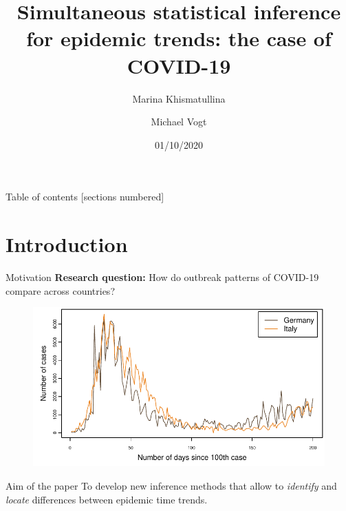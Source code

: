 \documentclass[10pt]{beamer}
\title{Simultaneous statistical inference for epidemic trends: the case of COVID-19}
\date{01/10/2020}
\author{Marina Khismatullina \and Michael Vogt}
\begin{document}
\maketitle

\begin{frame}{Table of contents}
  [sections numbered]
  \tableofcontents[hideallsubsections]
\end{frame}

\section{Introduction}


\begin{frame}{Motivation}
	\textbf{Research question:}	
	How do outbreak patterns of COVID-19 compare across countries?
	\begin{figure}
    		\centering
    		\includegraphics[height=0.45\textheight]{plots/Germany_and_Italy.pdf}
    		\label{fig:DEUvsITA}
  	\end{figure}\pause
	\vspace{-3mm}
	\begin{block}{Aim of the paper}
	To develop new inference methods that allow to \textit{identify} and \textit{locate} differences between epidemic time trends.
	\end{block}
\end{frame}
\end{document}
